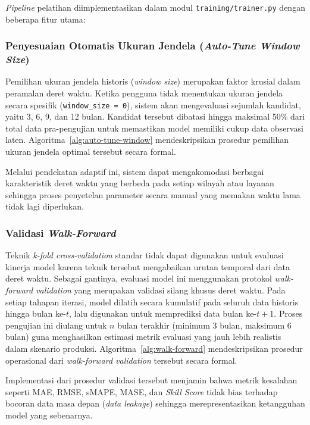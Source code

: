 \textit{Pipeline} pelatihan diimplementasikan dalam modul \texttt{training/trainer.py} dengan beberapa fitur utama:

\subsubsection{Penyesuaian Otomatis Ukuran Jendela (\textit{Auto-Tune Window Size})}

Pemilihan ukuran jendela historis (\textit{window size}) merupakan faktor krusial dalam peramalan deret waktu. Ketika pengguna tidak menentukan ukuran jendela secara spesifik (\texttt{window\_size = 0}), sistem akan mengevaluasi sejumlah kandidat, yaitu 3, 6, 9, dan 12 bulan. Kandidat tersebut dibatasi hingga maksimal 50\% dari total data pra-pengujian untuk memastikan model memiliki cukup data observasi laten. Algoritma~\ref{alg:auto-tune-window} mendeskripsikan prosedur pemilihan ukuran jendela optimal tersebut secara formal.



Melalui pendekatan adaptif ini, sistem dapat mengakomodasi berbagai karakteristik deret waktu yang berbeda pada setiap wilayah atau layanan sehingga proses penyetelan parameter secara manual yang memakan waktu lama tidak lagi diperlukan.

\subsubsection{Validasi \textit{Walk-Forward}}

Teknik \textit{k-fold cross-validation} standar tidak dapat digunakan untuk evaluasi kinerja model karena teknik tersebut mengabaikan urutan temporal dari data deret waktu. Sebagai gantinya, evaluasi model ini menggunakan protokol \textit{walk-forward va\-li\-da\-tion} yang merupakan validasi silang khusus deret waktu. Pada setiap tahapan iterasi, model dilatih secara kumulatif pada seluruh data historis hingga bulan ke-$t$, lalu digunakan untuk memprediksi data bulan ke-$t+1$. Proses pengujian ini diulang untuk $n$ bulan terakhir (minimum 3 bulan, maksimum 6 bulan) guna menghasilkan estimasi metrik evaluasi yang jauh lebih realistis dalam skenario produksi. Algoritma~\ref{alg:walk-forward} mendeskripsikan prosedur operasional dari \textit{walk-forward va\-li\-da\-tion} tersebut secara formal.



Implementasi dari prosedur validasi tersebut menjamin bahwa metrik kesalahan seperti MAE, RMSE, sMAPE, MASE, dan \textit{Skill Score} tidak bias terhadap bocoran data masa depan (\textit{data leakage}) sehingga merepresentasikan ketangguhan model yang sebenarnya.

